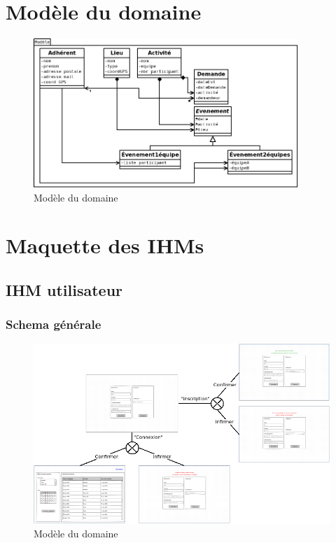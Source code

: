 \documentclass[a4paper,11pt]{article}
\begin{document}
\begin{titlepage}
  
\end{titlepage}
\tableofcontents
\pagebreak


\section{Modèle du domaine}

\begin{figure}[h]
  \begin{center}
    \includegraphics[width=10cm]{../modèle.png}
    \caption{Modèle du domaine}
  \end{center}
\end{figure}

\section{Maquette des IHMs}

\subsection{IHM utilisateur}

\subsubsection{Schema générale}

\begin{figure}[H]
  \begin{center}
    \includegraphics[width=14cm]{../../IHM/graphique_IHM.png}
    \caption{Modèle du domaine}
  \end{center}
\end{figure}
\end{document}

